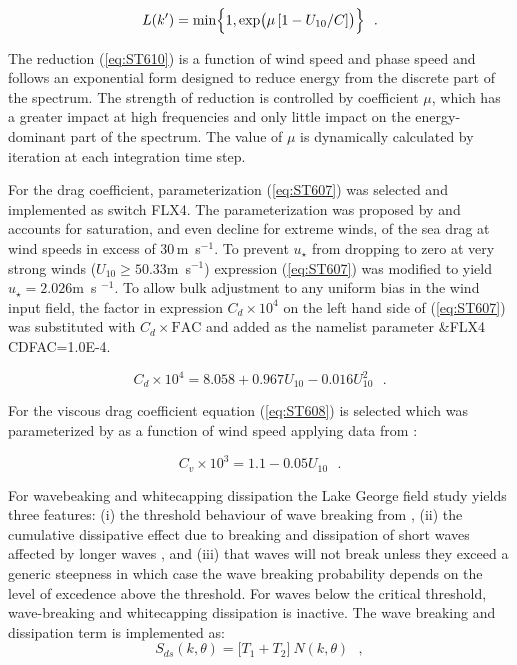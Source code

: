 \begin{equation}\label{eq:ST610}
L(k^\prime) = \min \Bigl \{ 1, \exp \bigl ( \mu\,[1- U_{10}/C] \bigr ) \Bigr
\}  \:\:\: .
\end{equation}

\noindent
The reduction (\ref{eq:ST610}) is a function of wind speed and phase speed and
follows an exponential form designed to reduce energy from the discrete part
of the spectrum. The strength of reduction is controlled by coefficient $\mu$,
which has a greater impact at high frequencies and only little impact on the
energy-dominant part of the spectrum. The value of $\mu$ is dynamically
calculated by iteration at each integration time step.

For the drag coefficient, parameterization (\ref{eq:ST607}) was selected and
implemented as switch {\code FLX4}. The parameterization was proposed by
\citet{art:Hwa11} and accounts for saturation, and even decline 
for extreme winds, of the sea drag at wind speeds in excess of 30\,m~s$^{-1}$.
To prevent $u_\star$ from dropping to zero at very strong winds
($U_{10}\ge50.33$m~s$^{-1}$) expression (\ref{eq:ST607}) was modified to yield
$u_\star=2.026$m~s $^{-1}$. To allow bulk adjustment to any uniform bias in
the wind input field, the factor in expression $C_d \times 10^4$ on the left
hand side of (\ref{eq:ST607}) was substituted with $C_d \times \mathrm{FAC}$
and added as the namelist parameter {\code \&FLX4 CDFAC=1.0E-4}.

\begin{equation}\label{eq:ST607}
C_d \times 10^4 = 8.058 + 0.967 U_{10} - 0.016 U_{10}^2 \:\:\: .
\end{equation}

\noindent
For the viscous drag coefficient equation (\ref{eq:ST608}) is selected which
was parameterized by \citet{art:Tea10} as a function of wind speed applying
data from \citet{art:BP98}:

\begin{equation}\label{eq:ST608}
  C_v \times 10^3 = 1.1 - 0.05 U_{10} \:\:\: .
\end{equation}

\noindent
For wavebeaking and whitecapping dissipation the Lake George field study
yields three features: (i) the threshold behaviour of wave breaking from
\citep{art:BBY00,art:BGM02}, (ii) the cumulative dissipative effect due to
breaking and dissipation of short waves affected by longer waves
\citep{pro:Don01, pro:BY05, art:YB06, art:Bea10}, and (iii) that waves 
will not break unless they exceed a generic steepness in which case the wave
breaking probability depends on the level of excedence above the threshold.
For waves below the critical threshold, wave-breaking and whitecapping
dissipation is inactive. The wave breaking and dissipation term is implemented
as:
\begin{equation}\label{eq:ST620}
  S_{ds}(k,\theta) = \bigl [ T_1 + T_2 \bigr ]\ N(k,\theta) \:\:\: ,
\end{equation}

